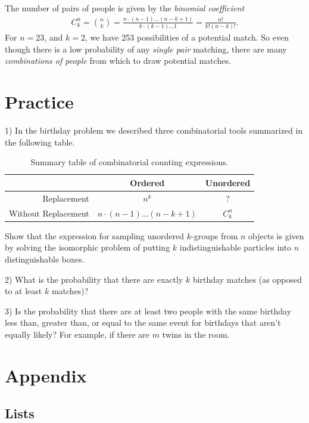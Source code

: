The number of pairs of
people is given by the \emph{binomial coefficient}
\begin{align}
C_{k}^{n} = \binom{n}{k} = \frac{n\cdot(n-1)\ldots(n-k+1)}{k\cdot(k-1)\ldots 1} = \frac{n!}{k!(n - k)!}.
\end{align}
For \(n = 23\), 
and \(k = 2\), 
we have 253 possibilities of a potential match. 
So even though there is a low probability of any \emph{single pair} matching, 
there are many \emph{combinations of people} from which to draw potential matches.

\clearpage
\section{Practice}

1) In the birthday problem we described three combinatorial 
tools summarized in the following table.

\begin{table}[h!]
\centering
\begin{tabular}{| r | c | c |}
\hline
 & Ordered & Unordered \\\hline
Replacement & \(n^{k}\) & ? \\\hline
Without Replacement  & \(n\cdot (n-1) \ldots (n-k+1)\) & \(C_{k}^{n}\) \\\hline
\end{tabular}
\caption{%
Summary table of combinatorial counting expressions.
}
\end{table}

Show that the expression for sampling unordered \(k\)-groups from \(n\) objects is 
given by solving the isomorphic problem of putting \(k\) indistinguishable particles 
into \(n\) distinguishable boxes.

2) What is the probability that there are exactly \(k\) birthday matches (as opposed to at least \(k\) matches)?

3) Is the probability that there are at least two people with the same birthday less than, 
greater than, 
or equal to the same event for birthdays that aren't equally likely? 
For example, 
if there are \(m\) twins in the room.

\section{Appendix}

\subsection{Lists}

